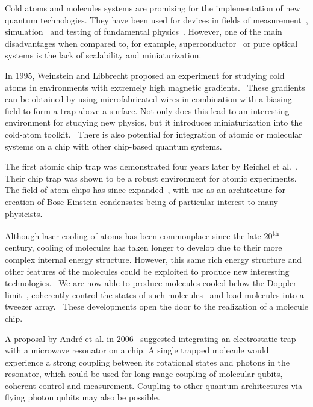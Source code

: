 Cold atoms and molecules systems are promising for the implementation of new
quantum technologies. They have been used for devices in fields of
measurement~\cite{PhysRevLett.120.103201}, simulation~\cite{Gross995} and testing of
fundamental physics~\cite{DeMille990}. However, one of the main disadvantages
when compared to, for example, superconductor~\cite{Wallraff2004} or pure
optical~\cite{Browne2017} systems is the lack of scalability and
miniaturization.~\cite{nielsenandchuang}

In 1995, Weinstein and Libbrecht proposed an experiment for
studying cold atoms in environments with extremely high magnetic
gradients.~\cite{PhysRevA.52.4004} These gradients can be obtained by using
microfabricated wires in combination with a biasing field to form a trap above
a surface. Not only does this lead to an interesting environment for studying
new physics, but it introduces miniaturization into the cold-atom
toolkit.~\cite{2011Ac} There is also potential for integration of atomic or
molecular systems on a chip with other chip-based quantum
systems.~\cite{2011Ac, Kubo2011}

The first atomic chip trap was demonstrated four years later by Reichel et
al.~\cite{Reichel1999}. Their chip trap was shown to be a robust environment for
atomic experiments. The field of atom chips has since expanded~\cite{2011Ac},
with use as an architecture for creation of Bose-Einstein condensates being of
particular interest to many physicists.~\cite{Ott2001}

Although laser cooling of atoms has been commonplace since the late
20\textsuperscript{th} century, cooling of molecules has taken longer to develop
due to their more complex internal energy structure. However, this same rich
energy structure and other features of the molecules could be exploited to
produce new interesting technologies.~\cite{Tarbutt2018} We are now able to
produce \CaF{} molecules cooled below the Doppler limit~\cite{Truppe2017},
coherently control the states of such molecules~\cite{Williams2018}
and load molecules into a tweezer array.~\cite{Anderegg2019} These developments
open the door to the realization of a molecule chip.

A proposal by Andr\'e et al. in 2006~\cite{Andre2006} suggested integrating an
electrostatic trap with a microwave resonator on a chip. A single trapped
molecule would experience a strong coupling between its rotational states and
photons in the resonator, which could be used for long-range coupling of
molecular qubits, coherent control and measurement. Coupling to other quantum
architectures via flying photon qubits may also be
possible.~\cite{PhysRevLett.92.063601}

